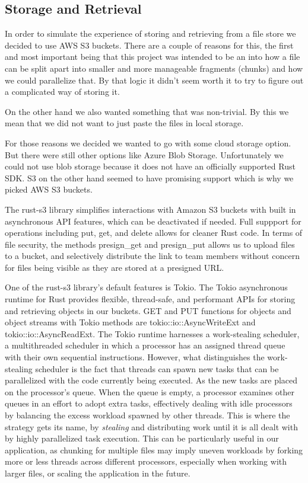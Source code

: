 \documentclass[conference]{IEEEtran}
\begin{document}
\subsection{Storage and Retrieval}

In order to simulate the experience of storing and retrieving from a file store we decided to use AWS S3 buckets.
There are a couple of reasons for this, the first and most important being that this project was intended to be an
into how a file can be split apart into smaller and more manageable fragments (chunks) and how we could parallelize that.
By that logic it didn't seem worth it to try to figure out a complicated way of storing it.

On the other hand we also wanted something that was non-trivial.
By this we mean that we did not want to just paste the files in local storage.

For those reasons we decided we wanted to go with some cloud storage option.
But there were still other options like Azure Blob Storage.
Unfortunately we could not use blob storage because it does not have an officially supported Rust SDK.
S3 on the other hand seemed to have promising support which is why we picked AWS S3 buckets.

The rust-s3 library simplifies interactions with Amazon S3 buckets with built in asynchronous API features, 
which can be deactivated if needed. Full suppport for operations including put, get, and delete allows for 
cleaner Rust code. In terms of file security, the methods presign\_get and presign\_put allows us to upload files
to a bucket, and selectively distribute the link to team members without concern for files being visible as
they are stored at a presigned URL. 

One of the rust-s3 library's default features is Tokio. The Tokio asynchronous runtime for Rust provides flexible, 
thread-safe, and performant APIs for storing and retrieving objects in our buckets. GET and PUT functions for objects
and object streams with Tokio methods are tokio::io::AsyncWriteExt and tokio::io::AsyncReadExt. The Tokio runtime harnesses
a work-stealing scheduler, a multithreaded scheduler in which a processor has an assigned thread queue with their own 
sequential instructions. However, what distinguishes the work-stealing scheduler is the fact that threads can spawn new tasks 
that can be parallelized with the code currently being executed. As the new tasks are placed on the processor's queue. When the 
queue is empty, a processor examines other queues in an effort to adopt extra tasks, effectively dealing with idle processors 
by balancing the excess workload spawned by other threads. This is where the strategy gets its name, by \textit{stealing} and
distributing work until it is all dealt with by highly parallelized task execution. This can be particularly useful in our 
application, as chunking for multiple files may imply uneven workloads by forking more or less threads across different processors, 
especially when working with larger files, or scaling the application in the future.
\end{document}

